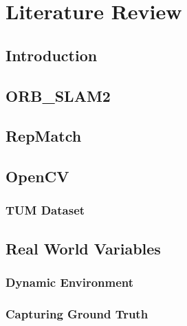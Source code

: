 \chapter{Literature Review}
\label{c:literaturereview}
\section{Introduction}
\label{c:literaturereview:intro}


\section{ORB\_SLAM2}
\label{c:literaturereview:orbslam2}


\section{RepMatch}
\label{c:literaturereview:rematch}


\section{OpenCV}
\label{c:literaturereview:opencv}


\subsection{TUM Dataset}
\label{c:literaturereview:tumdata}




\section{Real World Variables}
\label{c:literaturereview:variables}


\subsection{Dynamic Environment}
\label{c:literaturereview:variables:dynamicenv}


\subsection{Capturing Ground Truth}
\label{c:literaturereview:variables:groundtruth}



